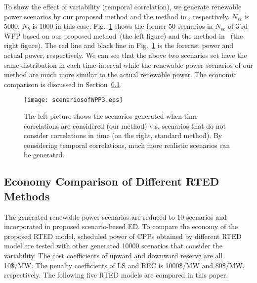 To show the effect of variability (temporal correlation), we generate renewable power scenarios by our proposed method and the method in \cite{copula_Zhang}, respectively. $N_{sc}$ is 5000, $N_{b}$ is 1000 in this case. Fig.~\ref{scenario1} shows the former 50 scenarios in $N_{sc}$ of 3'rd WPP based on our proposed method~(the left figure) and the method in \cite{copula_Zhang}~(the right figure). The red line and black line in Fig.~\ref{scenario1} is the forecast power and actual power, respectively. We can see that the above two scenarios set have the same distribution in each time interval while the renewable power scenarios of our method are much more similar to the actual renewable power. The economic comparison is discussed in Section~\ref{sec:econ}.
\begin{figure}[ht]
	\begin{center}
		\texttt{[image: scenariosofWPP3.eps]}\\
		\caption{The left picture shows the scenarios generated when time correlations are considered (our method) v.s. scenarios that do not consider correlations in time (on the right, standard method). By considering temporal correlations, much more realistic scenarios can be generated.}\label{scenario1}
	\end{center}
\end{figure}





\vspace{-1em}

\subsection {Economy Comparison of Different RTED Methods} \label{sec:econ}

The generated renewable power scenarios are reduced to 10 scenarios and incorporated in proposed scenario-based ED. To compare the economy of the proposed RTED model, scheduled power of CPPs obtained by different RTED model are tested with other generated 10000 scenarios that consider the variability. {The cost coefficients of upward and downward reserve are all 10\$/MW.} The penalty coefficients of LS and REC is 1000\$/MW and 80\$/MW, respectively. The following five RTED models are compared in this paper.

